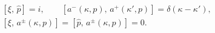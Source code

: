 \begin{equation}
\begin{split}
&[\xi,\,\hat{p}]=i,\qquad
[a^{-}(\kappa,p),\,a^+(\kappa',p)]=\delta(\kappa -\kappa'),
\\
&
[\xi,\,a^{\pm}(\kappa,p)]=
[\hat{p},\,a^{\pm}(\kappa,p)]=0.
\end{split}
\end{equation}

